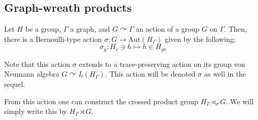 \documentclass{amsart}
\theoremstyle{definition}
\begin{document}
\subsection{Graph-wreath products}

Let $H$ be a group, $\Gamma$ a graph, and
$G\curvearrowright \Gamma$ an action of a group $G$ on $\Gamma$.  
Then, there is a Bernoulli-type action 
$\sigma : G\to \mathrm{Aut}(H_{\Gamma})$
given by the following;
\[
\sigma_g : H_v \ni h \longmapsto h \in H_{gv}
\]

Note that this action $\sigma$ extends to a trace-preserving action 
on its group von Neumann algebra $G\curvearrowright L(H_{\Gamma})$. 
This action will be denoted $\sigma$ as well in the sequel. 

From this action one can construct the crossed product group 
$H_{\Gamma}\rtimes_{\sigma} G$. We will simply write this by $H_{\Gamma}\rtimes G$.  
\end{document}
